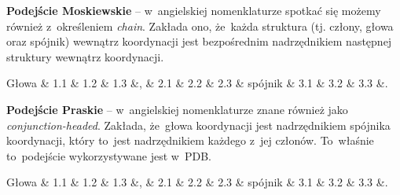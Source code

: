 \documentclass[licencjacka]{pracamgr_Kogni}
\begin{document}
\textbf{Podejście Moskiewskie} -- w~angielskiej nomenklaturze spotkać się możemy również z~określeniem \textit{chain}. Zakłada ono, że~każda struktura (tj. człony, głowa oraz spójnik) wewnątrz koordynacji jest bezpośrednim nadrzędnikiem następnej struktury wewnątrz koordynacji.
\begin{exe}
    \ex
    \begin{dependency}[theme = simple, group style = outer bubble]
        \centering
        \begin{deptext}[column sep=0.5cm]
            Głowa \& 1.1 \& 1.2 \& 1.3 \&, \& 2.1 \& 2.2 \& 2.3 \& spójnik \& 3.1 \& 3.2 \& 3.3 \&. \\
        \end{deptext}
    \end{dependency}
    \label{ex:chain}
\end{exe}
\textbf{Podejście Praskie} -- w~angielskiej nomenklaturze znane również jako \textit{conjunction-headed}. Zakłada, że~głowa koordynacji jest nadrzędnikiem spójnika koordynacji, który to~jest nadrzędnikiem każdego z~jej członów. To~właśnie to~podejście wykorzystywane jest w~PDB.
\begin{exe}
    \ex 
    \begin{dependency}[theme = simple, group style = outer bubble]
        \centering
        \begin{deptext}[column sep=0.5cm]
        Głowa \& 1.1 \& 1.2 \& 1.3 \&, \& 2.1 \& 2.2 \& 2.3 \& spójnik \& 3.1 \& 3.2 \& 3.3 \&. \\
        \end{deptext}
    \end{dependency}
    \label{ex:conjunction-headed}
\end{exe}
\end{document}
